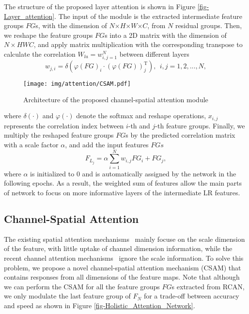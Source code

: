 \documentclass[runningheads]{llncs}
\begin{document}
The structure of the proposed layer attention is shown in Figure \ref{fig-Layer_attention}. The input of the module is the extracted intermediate feature groups $FG$s, with the dimension of $ N $$\times$$ H $$\times$$ W $$\times$$ C $, from $N$ residual groups. 
Then, we reshape the feature groups $FG$s into a 2D matrix with the dimension of $ N\times HWC$, and apply matrix multiplication with the corresponding transpose
to calculate the correlation $W_{la} = w_{i,j=1}^N$ between different layers
\begin{equation}
w_{j,i}= \delta(\varphi(FG)_i \cdot (\varphi(FG))_j^{\mathrm{T}}) ,  ~~i,j = 1,2,...,N ,
\end{equation}
\begin{figure*}[t]\footnotesize
	\begin{center}
		\texttt{[image: img/attention/CSAM.pdf]}
	\end{center}


	\caption{Architecture of the proposed channel-spatial attention module}


	\label{fig-CSAM}
\end{figure*}
where $\delta(\cdot)$ and $\varphi(\cdot)$ denote the softmax and reshape operations, $ x_{i,j} $ represents the correlation index between $i$-th and $j$-th feature groups. 
Finally, we multiply the reshaped feature groups $FG$s by the predicted correlation matrix with a scale factor $ \alpha $, and add the input features $FGs$
\begin{equation}
F_{L_j}=\alpha \sum_{i=1}^{N} w_{i,j} FG_{i}+FG_{j} ,
\end{equation}
where $ \alpha $ is initialized to $0$ and is automatically assigned by the network in the following epochs. 
As a result, the weighted sum of features allow the main parts of network to focus on more informative layers of the intermediate LR features.





\subsection{Channel-Spatial Attention}
\label{sec-csam}
The existing spatial attention mechanisms~\cite{woo2018cbam,kim2018ram} mainly focuse on the scale dimension of the feature, with little uptake of channel dimension information, while the recent channel attention mechanisms~\cite{zhang2018image,zhang2018residual,dai2019second} ignore the scale information. 
To solve this problem, we propose a novel channel-spatial attention mechanism (CSAM) that contains responses from all dimensions of the feature maps. Note that although we can perform the CSAM for all the feature groups $FG$s extracted from RCAN, we only modulate the last feature group of $F_N$ for a trade-off between accuracy and speed as shown in Figure \ref{fig-Holistic_Attention_Network}.
\end{document}
